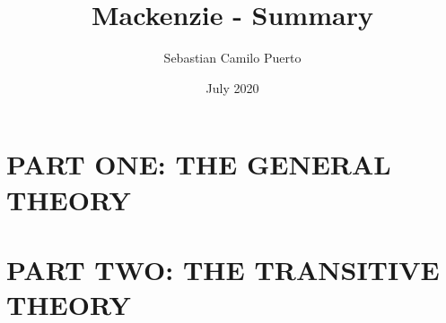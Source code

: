 \documentclass{report}
\title{Mackenzie - Summary}
\author{Sebastian Camilo Puerto}
\date{July 2020}
\begin{document}
\maketitle

\tableofcontents

\part{PART ONE: THE GENERAL THEORY}











\part{PART TWO: THE TRANSITIVE THEORY}




\end{document}
